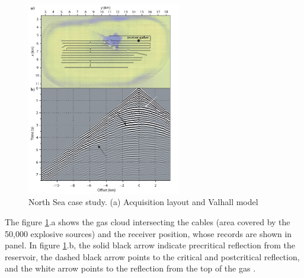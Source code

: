 \begin{figure}[!h]
\centering 
\includegraphics[width=0.6\textwidth]{images/sim1.png}
\caption{ North Sea case study. (a) Acquisition layout and Valhall model  \cite{Amestoy2016}}
\label{sim1} 
\end{figure}
The figure \ref{sim1}.a shows the gas cloud intersecting the cables (area covered by the 50,000 explosive sources) and the receiver position, whose records are shown in panel. In figure \ref{sim1}.b, the solid black arrow indicate precritical reflection from the reservoir, the dashed black arrow points to the critical and postcritical reflection, and the white arrow points to the reflection from the top of the gas \cite{Operto2015, Amestoy2016}.


